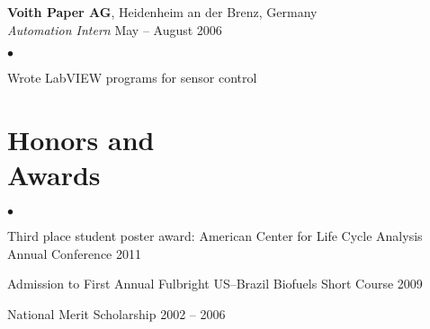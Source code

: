 \documentclass[margin,line,10pt]{res}
\newenvironment{list2}{
  \begin{list}{$\bullet$}{%
      \setlength{\itemsep}{0in}
      \setlength{\parsep}{0in} \setlength{\parskip}{0in}
      \setlength{\topsep}{0in} \setlength{\partopsep}{0in}
      \setlength{\leftmargin}{0.2in}}}{\end{list}}
\begin{document}
\begin{resume}
{\bf Voith Paper AG}, Heidenheim an der Brenz, Germany\\
\vspace{-.3cm}
{\em Automation Intern} \hfill May -- August 2006\\
\begin{list2}
\item Wrote LabVIEW programs for sensor control
\end{list2}

\section{\sc Honors and\\Awards}
\begin{list2}
\item Third place student poster award: American Center for
Life Cycle Analysis Annual Conference \hfill 2011
\item Admission to First Annual Fulbright US--Brazil Biofuels Short Course \hfill 2009
\item National Merit Scholarship			\hfill 2002 -- 2006\\
\end{list2}

\vspace*{-.2in}




\end{resume}
\end{document}
